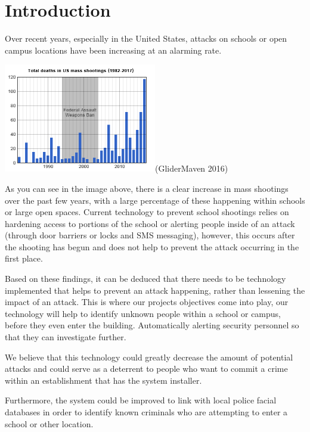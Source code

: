 \documentclass[
  english,
  a4paper,
,tablecaptionabove
]{scrartcl}
\begin{document}
\newpage

\hypertarget{introduction}{%
\section{Introduction}\label{introduction}}

Over recent years, especially in the United States, attacks on schools
or open campus locations have been increasing at an alarming rate.

\includegraphics[width=0.5\textwidth,height=\textheight]{images/ppm-images/shootings.png}(GliderMaven
2016)

As you can see in the image above, there is a clear increase in mass
shootings over the past few years, with a large percentage of these
happening within schools or large open spaces. Current technology to
prevent school shootings relies on hardening access to portions of the
school or alerting people inside of an attack (through door barriers or
locks and SMS messaging), however, this occurs after the shooting has
begun and does not help to prevent the attack occurring in the first
place.

Based on these findings, it can be deduced that there needs to be
technology implemented that helps to prevent an attack happening, rather
than lessening the impact of an attack. This is where our projects
objectives come into play, our technology will help to identify unknown
people within a school or campus, before they even enter the building.
Automatically alerting security personnel so that they can investigate
further.

We believe that this technology could greatly decrease the amount of
potential attacks and could serve as a deterrent to people who want to
commit a crime within an establishment that has the system installer.

Furthermore, the system could be improved to link with local police
facial databases in order to identify known criminals who are attempting
to enter a school or other location.
\end{document}
